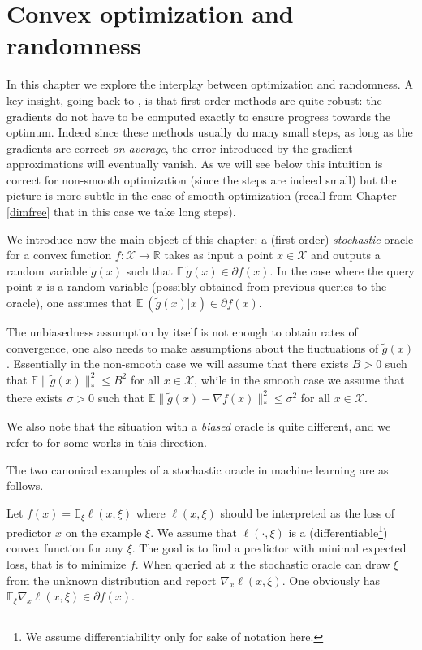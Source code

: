 \documentclass[openany]{now}
\newcommand{\tg}{\tilde{g}}
\newcommand{\E}{\mathbb{E}}
\newcommand{\R}{\mathbb{R}}
\newcommand{\cX}{\mathcal{X}}
\renewcommand{\tilde}{\widetilde}
\begin{document}
\chapter{Convex optimization and randomness}
\label{rand}
In this chapter we explore the interplay between optimization and randomness. A key insight, going back to \cite{RM51}, is that first order methods are quite robust: the gradients do not have to be computed exactly to ensure progress towards the optimum. Indeed since these methods usually do many small steps, as long as the gradients are correct {\em on average}, the error introduced by the gradient approximations will eventually vanish. As we will see below this intuition is correct for non-smooth optimization (since the steps are indeed small) but the picture is more subtle in the case of smooth optimization (recall from Chapter \ref{dimfree} that in this case we take long steps).

We introduce now the main object of this chapter: a (first order) {\em stochastic} oracle for a convex function $f : \cX \rightarrow \R$ takes as input a point $x \in \cX$ and outputs a random variable $\tg(x)$ such that $\E \ \tg(x) \in \partial f(x)$. In the case where the query point $x$ is a random variable (possibly obtained from previous queries to the oracle), one assumes that $\E \ (\tg(x) | x) \in \partial f(x)$.


The unbiasedness assumption by itself is not enough to obtain rates of convergence, one also needs to make assumptions about the fluctuations of $\tg(x)$.  Essentially in the non-smooth case we will assume that there exists $B >0$ such that $\E \|\tg(x)\|_*^2 \leq B^2$ for all $x \in \cX$, while in the smooth case we assume that there exists $\sigma > 0$ such that  $\E \|\tg(x) - \nabla f(x)\|_*^2 \leq \sigma^2$ for all $x \in \cX$.

We also note that the situation with a {\em biased} oracle is quite different, and we refer to \cite{Asp08, SLRB11} for some works in this direction.

The two canonical examples of a stochastic oracle in machine learning are as follows. 

Let $f(x) = \E_{\xi} \ell(x, \xi)$ where $\ell(x, \xi)$ should be interpreted as the loss of predictor $x$ on the example $\xi$. We assume that $\ell(\cdot, \xi)$ is a (differentiable\footnote{We assume differentiability only for sake of notation here.}) convex function for any $\xi$. The goal is to find a predictor with minimal expected loss, that is to minimize $f$. When queried at $x$ the stochastic oracle can draw $\xi$ from the unknown distribution and report $\nabla_x \ell(x, \xi)$. One obviously has $\E_{\xi} \nabla_x \ell(x, \xi) \in \partial f(x)$. 
\end{document}
